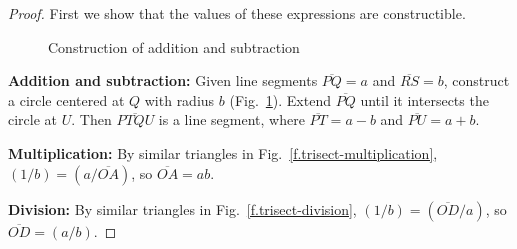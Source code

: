 \begin{proof} First we show that the values of these expressions are constructible.

\medskip

\begin{figure}[b]
\begin{center}
\end{center}
\caption{Construction of addition and subtraction}\label{f.trisect-add-subtract}
\end{figure}

\noindent\textbf{Addition and subtraction:}
Given line segments $\overline{PQ}=a$ and $\overline{RS}=b$, construct a circle centered at $Q$ with radius $b$ (Fig.~\ref{f.trisect-add-subtract}). Extend $\overline{PQ}$ until it intersects the circle at $U$. Then $\overline{PTQU}$ is a line segment, where $\overline{PT}=a-b$ and $\overline{PU}=a+b$.

\newpage

\noindent\textbf{Multiplication:}
By similar triangles in Fig.~\ref{f.trisect-multiplication},
$(1/b)=(a/\overline{OA})$, so $\overline{OA}=ab$.

\medskip

\noindent\textbf{Division:}
By similar triangles in Fig.~\ref{f.trisect-division},
$(1/b)=(\overline{OD}/a)$, so $\overline{OD}=(a/b)$.


\end{proof}
